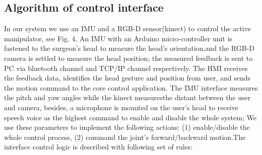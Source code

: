 \documentclass[journal,twoside]{IEEEtran}
\theoremstyle{definition}
\begin{document}


\subsection{Algorithm of control interface}

 In our system we use an IMU and a RGB-D sensor(kinect) to
control the active manipulator, see Fig. 4. An IMU with an
Arduino micro-controller unit is fastened to the surgeon’s
head to measure the head’s orientation,and the RGB-D camera is settled to measure the head position; the measured feedback
is sent to PC via bluetooth channel and TCP/IP channel respectively. The HMI receives the
feedback data, identifies the head gesture and position from user, and sends
the motion command to the core control application.
The IMU interface measures the pitch and yaw angles
while the kinect measuresthe distant between the user and camera, besides, a microphone is mounted on the user's head to receive speech voice as the highest command to enable and disable the whole system;
 We use these parameters
to implement the following actions: (1) enable/disable the
whole control process, (2)
command the joint’s forward/backward motion.The
interface control logic is described with following set of
rules:
\end{document}
